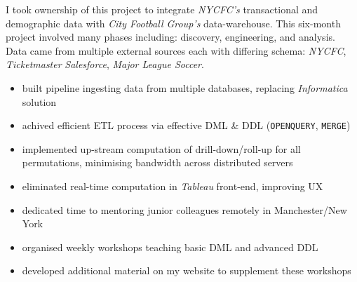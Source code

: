 \documentclass[letterpaper,11pt]{article}
\begin{document}
\begin{description}[style=multiline,leftmargin=3cm]
	\item[New York City FC Project]
	      I took ownership of this project to integrate \textit{NYCFC's} transactional and demographic data with \textit{City Football Group's} data-warehouse. This six-month project involved many phases including: discovery, engineering, and analysis. Data came from multiple external sources each with differing schema: \textit{NYCFC}, \textit{Ticketmaster} \textit{Salesforce}, \textit{Major League Soccer}.

	      \begin{description}[style=multiline,leftmargin=2.5cm]
		      \item[Data Pipeline]
		            {
		            \begin{itemize}
			            \item built pipeline ingesting data from multiple databases, replacing \textit{Informatica} solution
			            \item achived efficient ETL process via effective DML \& DDL (\texttt{OPENQUERY}, \texttt{MERGE})
		            \end{itemize}
		            }
		      \item[Data Cubes]
		            {
		            \begin{itemize}
			            \item implemented up-stream computation of drill-down/roll-up for all permutations, minimising bandwidth across distributed servers
			            \item eliminated real-time computation in \textit{Tableau} front-end, improving UX
		            \end{itemize}
		            }
		      \item[Mentoring]
		            {
		            \begin{itemize}
			            \item dedicated time to mentoring junior colleagues remotely in Manchester/New York
			            \item organised weekly workshops teaching basic DML and advanced DDL
			            \item developed additional material on my website to supplement these workshops
		            \end{itemize}
		            }
	      \end{description}
	\item[GDPR Pipeline]
	      \begin{itemize}

\end{itemize}
\end{description}
\end{document}
